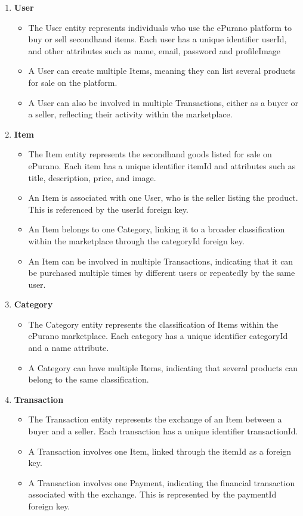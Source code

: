 \begin{enumerate}
    \item \textbf{User}
    \begin{itemize}
        \item The User entity represents individuals who use the ePurano platform to buy or sell secondhand items. Each user has a unique identifier userId, and other attributes such as name, email, password and profileImage
        \item A User can create multiple Items, meaning they can list several products for sale on the platform.
        \item A User can also be involved in multiple Transactions, either as a buyer or a seller, reflecting their activity within the marketplace.
    \end{itemize}

    \item \textbf{Item}
    \begin{itemize}
        \item The Item entity represents the secondhand goods listed for sale on ePurano. Each item has a unique identifier itemId and attributes such as title, description, price, and image.
        \item An Item is associated with one User, who is the seller listing the product. This is referenced by the userId foreign key.
        \item An Item belongs to one Category, linking it to a broader classification within the marketplace through the categoryId foreign key.
        \item An Item can be involved in multiple Transactions, indicating that it can be purchased multiple times by different users or repeatedly by the same user.
    \end{itemize}

    \item \textbf{Category}
    \begin{itemize}
        \item The Category entity represents the classification of Items within the ePurano marketplace. Each category has a unique identifier categoryId and a name attribute.
        \item A Category can have multiple Items, indicating that several products can belong to the same classification.
    \end{itemize}
    \item \textbf{Transaction}
    \begin{itemize}
        \item The Transaction entity represents the exchange of an Item between a buyer and a seller. Each transaction has a unique identifier transactionId.
        \item A Transaction involves one Item, linked through the itemId as a foreign key.
        \item A Transaction involves one Payment, indicating the financial transaction associated with the exchange. This is represented by the paymentId foreign key.
    \end{itemize}
    

\end{enumerate}
